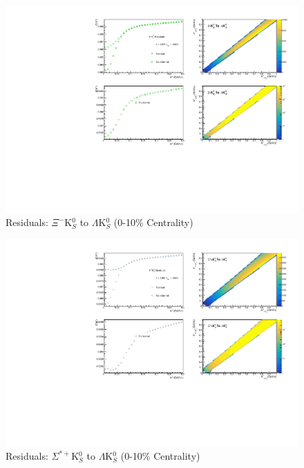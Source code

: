 \documentclass[../AnalysisNoteJBuxton.tex]{subfiles}
\begin{document}
\begin{figure}[h]
  \centering
  \includegraphics[width=\textwidth]{9_AdditionalFigures/Figures/Residuals/LamK0/Residuals_LamK0_0010_XiK0_MomResCrctn_NonFlatBgdCrctn_SingleLamParam_10Res_PrimMaxDecay4fm_UsingXiDataAndCoulombOnly.pdf}
  \caption[Residuals: $\Xi^{-}$K$^{0}_{S}$ to $\Lambda$K$^{0}_{S}$ (0-10\% Centrality)]{Residuals: $\Xi^{-}$K$^{0}_{S}$ to $\Lambda$K$^{0}_{S}$ (0-10\% Centrality)}
  \label{fig:Res_LamK0_0010_XiCK0}
\end{figure}


\begin{figure}[h]
  \centering
  \includegraphics[width=\textwidth]{9_AdditionalFigures/Figures/Residuals/LamK0/Residuals_LamK0_0010_SigStPK0_MomResCrctn_NonFlatBgdCrctn_SingleLamParam_10Res_PrimMaxDecay4fm_UsingXiDataAndCoulombOnly.pdf}
  \caption[Residuals: $\Sigma^{*+}$K$^{0}_{S}$ to $\Lambda$K$^{0}_{S}$ (0-10\% Centrality)]{Residuals: $\Sigma^{*+}$K$^{0}_{S}$ to $\Lambda$K$^{0}_{S}$ (0-10\% Centrality)}
  \label{fig:Res_LamK0_0010_SigStPK0}
\end{figure}
\end{document}
